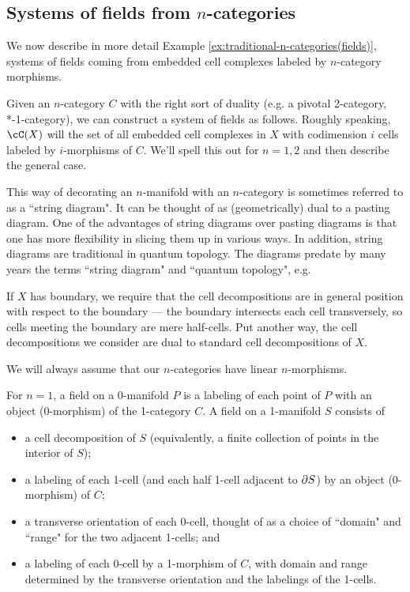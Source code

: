 \subsection{Systems of fields from $n$-categories}
\label{sec:example:traditional-n-categories(fields)}
We now describe in more detail Example \ref{ex:traditional-n-categories(fields)}, 
systems of fields coming from embedded cell complexes labeled
by $n$-category morphisms.

Given an $n$-category $C$ with the right sort of duality
(e.g. a pivotal 2-category, *-1-category),
we can construct a system of fields as follows.
Roughly speaking, $\cC(X)$ will the set of all embedded cell complexes in $X$
with codimension $i$ cells labeled by $i$-morphisms of $C$.
We'll spell this out for $n=1,2$ and then describe the general case.

This way of decorating an $n$-manifold with an $n$-category is sometimes referred to
as a ``string diagram".
It can be thought of as (geometrically) dual to a pasting diagram.
One of the advantages of string diagrams over pasting diagrams is that one has more
flexibility in slicing them up in various ways.
In addition, string diagrams are traditional in quantum topology.
The diagrams predate by many years the terms ``string diagram" and ``quantum topology", e.g. \cite{MR0281657,MR776784} %

If $X$ has boundary, we require that the cell decompositions are in general
position with respect to the boundary --- the boundary intersects each cell
transversely, so cells meeting the boundary are mere half-cells.
Put another way, the cell decompositions we consider are dual to standard cell
decompositions of $X$.

We will always assume that our $n$-categories have linear $n$-morphisms.

For $n=1$, a field on a 0-manifold $P$ is a labeling of each point of $P$ with
an object (0-morphism) of the 1-category $C$.
A field on a 1-manifold $S$ consists of
\begin{itemize}
    \item a cell decomposition of $S$ (equivalently, a finite collection
of points in the interior of $S$);
    \item a labeling of each 1-cell (and each half 1-cell adjacent to $\partial S$)
by an object (0-morphism) of $C$;
    \item a transverse orientation of each 0-cell, thought of as a choice of
``domain" and ``range" for the two adjacent 1-cells; and
    \item a labeling of each 0-cell by a 1-morphism of $C$, with
domain and range determined by the transverse orientation and the labelings of the 1-cells.
\end{itemize}

